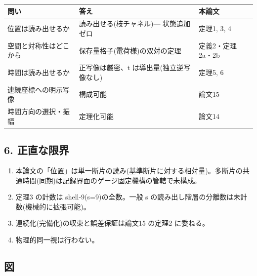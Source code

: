 \documentclass[
]{ltjsarticle}
\newcounter{none} %
\providecommand{\tightlist}{%
  \setlength{\itemsep}{0pt}\setlength{\parskip}{0pt}}
\begin{document}
{\def\LTcaptype{none} %
\begin{longtable}[]{@{}
  >{\raggedright\arraybackslash}p{}
  >{\raggedright\arraybackslash}p{}
  >{\raggedright\arraybackslash}p{}@{}}
\toprule\noalign{}
\begin{minipage}[b]{\linewidth}\raggedright
問い
\end{minipage} & \begin{minipage}[b]{\linewidth}\raggedright
答え
\end{minipage} & \begin{minipage}[b]{\linewidth}\raggedright
本論文
\end{minipage} \\
\midrule\noalign{}
\endhead
\bottomrule\noalign{}
\endlastfoot
位置は読み出せるか & 読み出せる(枝チャネル)--- 状態追加ゼロ & 定理1, 3,
4 \\
空間と対称性はどこから & 保存量格子(電荷様)の双対の定理 &
定義2・定理2a・2b \\
時間は読み出せるか & 正写像は厳密、t は導出量(独立逆写像なし) & 定理5,
6 \\
連続座標への明示写像 & 構成可能 & 論文15 \\
時間方向の選択・振幅 & 定理化可能 & 論文14 \\
\end{longtable}
}

\subsection{6. 正直な限界}\label{ux6b63ux76f4ux306aux9650ux754c}

\begin{enumerate}
\def\labelenumi{\arabic{enumi}.}
\tightlist
\item
  本論文の「位置」は単一断片の読み(基準断片に対する相対量)。多断片の共通時間(同期)は記録界面のゲージ固定機構の管轄で未構成。
\item
  定理3 の計数は shell-9(s=9)の全数。一般 s
  の読み出し階層の分離数は未計数(機械的に拡張可能)。
\item
  連続化(完備化)の収束と誤差保証は論文15 の定理2 に委ねる。
\item
  物理的同一視は行わない。
\end{enumerate}

\subsection{図}\label{ux56f3}
\end{document}

